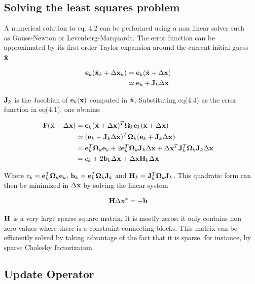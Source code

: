 \subsection{Solving the least squares problem}

A numerical solution to eq. 4.2 can be performed using a non linear solver such as Gauss-Newton or Levenberg-Marquardt.  The error function can be approximated by its first order Taylor expansion around the current initial guess $\breve{\mathbf x}$

\begin{align}
  \mathbf e_k(\breve{\mathbf x}_k + \Delta \mathbf x_k) &= \mathbf e_k(\breve{\mathbf x} + \Delta \mathbf x) \\
      & \simeq \mathbf e_k + \mathbf J_k \Delta \mathbf x
\end{align}

$\mathbf J_k$ is the Jacobian of $\mathbf e_k(\mathbf x)$ computed in $\breve{\mathbf x}$.  Substituting eq(4.4) as the error function in eq(4.1), one obtains:

\begin{align}
  \mathbf F(\breve{\mathbf x} + \Delta \mathbf x) &= \mathbf e_k(\breve{\mathbf x} + \Delta \mathbf x)^T \mathbf \Omega_k \mathbf e_k(\breve{\mathbf x} + \Delta \mathbf x) \\
  & \simeq (\mathbf e_k + \mathbf J_k \Delta \mathbf x)^T 
    \mathbf \Omega_k 
    (\mathbf e_k + \mathbf J_k \Delta \mathbf x) \\
  &= \mathbf e_k^T \mathbf \Omega_k \mathbf e_k 
    + 2 \mathbf e_k^T \mathbf \Omega_k \mathbf J_k \Delta \mathbf x 
    + \Delta \mathbf x^T \mathbf J_k^T \mathbf \Omega_k \mathbf J_k \Delta \mathbf x \\
  &= c_k + 2\mathbf b_k \Delta \mathbf x + \Delta \mathbf x \mathbf H_k \Delta \mathbf x
\end{align}

Where $c_k = \mathbf e_k^T \mathbf \Omega_k \mathbf e_k$, $\mathbf b_k = \mathbf e_k^T \mathbf \Omega_k \mathbf J_k$ and $\mathbf H_k = \mathbf J_k^T \mathbf \Omega_k \mathbf J_k$. This quadratic form can then be minimized in $\Delta \mathbf x$ by solving the linear system

\begin{align}
   \mathbf H \Delta \mathbf x^* = -\mathbf b
\end{align}

$\mathbf H$ is a very large sparse square matrix.  It is mostly zeros; it only contains non zero values where there is a constraint connecting blocks.  This matrix can be efficiently solved by taking advantage of the fact that it is sparse, for instance, by sparse Cholesky factorization.

\subsection{Update Operator}
\label{sec:oplus}

